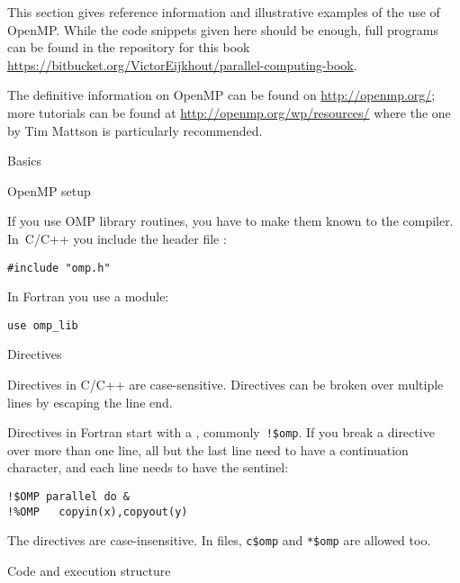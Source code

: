 
This section gives reference information and illustrative examples
of the use of OpenMP. While the code snippets given here should be enough,
full programs can be found in the repository for this book
\url{https://bitbucket.org/VictorEijkhout/parallel-computing-book}.

The definitive information on OpenMP can be found on
\url{http://openmp.org/}; more tutorials can be found at
\url{http://openmp.org/wp/resources/} where the one
by Tim Mattson is particularly recommended.

 {Basics}

 {OpenMP setup}

If you use OMP library routines, you have to make them known to
the compiler. In~C/C++ you include the header file :
\begin{verbatim}
#include "omp.h"
\end{verbatim}
In Fortran you use a module:
\begin{verbatim}
use omp_lib
\end{verbatim}

 {Directives}

Directives in C/C++ are case-sensitive. Directives can be broken over
multiple lines by escaping the line end.

Directives in Fortran start with a , commonly~\verb+!$omp+.
If you break a directive over more than one line, all but the last line
need to have a continuation character, and each line needs to have the sentinel:
\begin{verbatim}
!$OMP parallel do &
!%OMP   copyin(x),copyout(y)
\end{verbatim}
  The directives are case-insensitive. In
   files, \verb+c$omp+ and
  \verb+*$omp+ are allowed too.


 {Code and execution structure}

